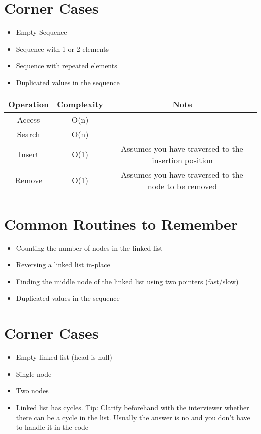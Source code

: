 \section{Corner Cases}
\begin{itemize}
	\item Empty Sequence
	\item Sequence with 1 or 2 elements
	\item Sequence with repeated elements
	\item Duplicated values in the sequence
\end{itemize}

\begin{center}
\begin{tabular}{||c c c||} 
 \hline
 Operation & Complexity & Note\\ [0.5ex] 
 \hline\hline
 Access & O(n) \\ 
 \hline
 Search & O(n) \\
 \hline
 Insert & O(1) & Assumes you have traversed to the insertion position \\ 
 \hline
 Remove & O(1) & Assumes you have traversed to the node to be removed \\
 \hline

\end{tabular}
\end{center}

\section{Common Routines to Remember}
\begin{itemize}
	\item Counting the number of nodes in the linked list
	\item Reversing a linked list in-place
	\item Finding the middle node of the linked list using two pointers (fast/slow)
	\item Duplicated values in the sequence
\end{itemize}


\section{Corner Cases}
\begin{itemize}
	\item Empty linked list (head is null)
	\item Single node
	\item Two nodes
	\item Linked list has cycles. Tip: Clarify beforehand with the interviewer whether there can be a cycle in the list. Usually the answer is no and you don't have to handle it in the code
\end{itemize}